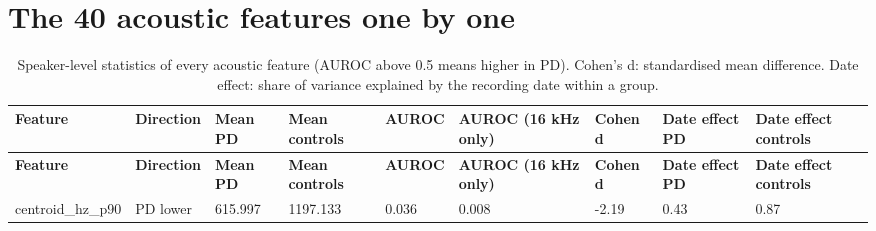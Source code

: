 \documentclass[11pt,a4paper]{article}
\begin{document}
\section{The 40 acoustic features one by one}\label{sec:app-features}
\begin{landscape}
\begin{center}\footnotesize\renewcommand{\arraystretch}{1.15}
\begin{longtable}{>{\raggedright\arraybackslash}p{4.20cm}>{\raggedright\arraybackslash}p{2.00cm}>{\raggedleft\arraybackslash}p{2.00cm}>{\raggedleft\arraybackslash}p{2.00cm}>{\raggedleft\arraybackslash}p{2.00cm}>{\raggedleft\arraybackslash}p{2.00cm}>{\raggedleft\arraybackslash}p{2.00cm}>{\raggedleft\arraybackslash}p{2.00cm}>{\raggedleft\arraybackslash}p{2.00cm}}
\caption{Speaker-level statistics of every acoustic feature (AUROC above 0.5 means higher in PD). Cohen's d: standardised mean difference. Date effect: share of variance explained by the recording date within a group.}\\
\toprule
\textbf{\hspace{0pt}Feature} & \textbf{\hspace{0pt}Direction} & \textbf{\hspace{0pt}Mean PD} & \textbf{\hspace{0pt}Mean controls} & \textbf{\hspace{0pt}AUROC} & \textbf{\hspace{0pt}AUROC (16 kHz only)} & \textbf{\hspace{0pt}Cohen d} & \textbf{\hspace{0pt}Date effect PD} & \textbf{\hspace{0pt}Date effect controls}\\\midrule\endfirsthead
\toprule
\textbf{\hspace{0pt}Feature} & \textbf{\hspace{0pt}Direction} & \textbf{\hspace{0pt}Mean PD} & \textbf{\hspace{0pt}Mean controls} & \textbf{\hspace{0pt}AUROC} & \textbf{\hspace{0pt}AUROC (16 kHz only)} & \textbf{\hspace{0pt}Cohen d} & \textbf{\hspace{0pt}Date effect PD} & \textbf{\hspace{0pt}Date effect controls}\\\midrule\endhead
\bottomrule\endfoot
\hspace{0pt}centroid\_\allowbreak{}hz\_\allowbreak{}p90 & \hspace{0pt}PD lower & \hspace{0pt}615.997 & \hspace{0pt}1197.133 & \hspace{0pt}0.036 & \hspace{0pt}0.008 & \hspace{0pt}-2.19 & \hspace{0pt}0.43 & \hspace{0pt}0.87\\

\end{longtable}
\end{center}
\end{landscape}
\end{document}
